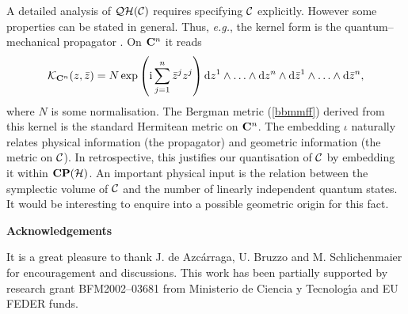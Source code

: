 \documentclass[a4paper,a4paper]{article}
\begin{document}
A detailed analysis of ${\cal QH}({\cal C})$ requires specifying ${\cal C}$ explicitly.
However some properties can be stated in general. Thus, {\it e.g.},
the kernel form is the quantum--mechanical propagator 
\cite{DR}. On ${\bf C}^n$ it reads 
\begin{equation}
{\cal K}_{{\bf C}^n}(z, \bar z) = N \,{\rm exp}\left({\rm i}\sum_{j=1}^n\bar z^j z^j\right)
{\rm d}z^1\wedge\ldots\wedge{\rm d}z^n\wedge{\rm d}\bar z^1\wedge\ldots\wedge{\rm d}\bar z^n,
\label{ceene}
\end{equation}
where $N$ is some normalisation. The Bergman metric (\ref{bbmmff}) derived from this kernel 
is the standard Hermitean metric on ${\bf C}^n$. The embedding $\iota$ naturally relates physical 
information (the propagator) and geometric information (the metric on ${\cal C}$). In retrospective, 
this justifies our quantisation of ${\cal C}$ by embedding it within ${\bf CP}({\cal H})$. 
An important physical input is the relation between the symplectic volume of ${\cal C}$ 
and the number of linearly independent quantum states.  It would be 
interesting to enquire into a possible geometric origin for this fact.


{\bf Acknowledgements}


It is a great pleasure to thank J. de Azc\'arraga, U. Bruzzo and M. Schlichenmaier 
for encouragement and discussions. This work has been partially supported by research grant 
BFM2002--03681 from Ministerio de Ciencia y Tecnolog\'{\i}a and EU FEDER funds.
\end{document}
